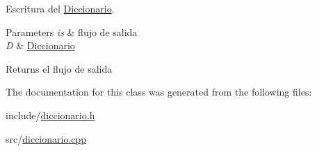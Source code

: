 Escritura del \mbox{\hyperlink{classDiccionario}{Diccionario}}. 


\begin{DoxyParams}{Parameters}
{\em is} & flujo de salida \\
\hline
{\em D} & \mbox{\hyperlink{classDiccionario}{Diccionario}} \\
\hline
\end{DoxyParams}
\begin{DoxyReturn}{Returns}
el flujo de salida 
\end{DoxyReturn}


The documentation for this class was generated from the following files\+:\begin{DoxyCompactItemize}
\item 
include/\mbox{\hyperlink{diccionario_8h}{diccionario.\+h}}\item 
src/\mbox{\hyperlink{diccionario_8cpp}{diccionario.\+cpp}}\end{DoxyCompactItemize}
